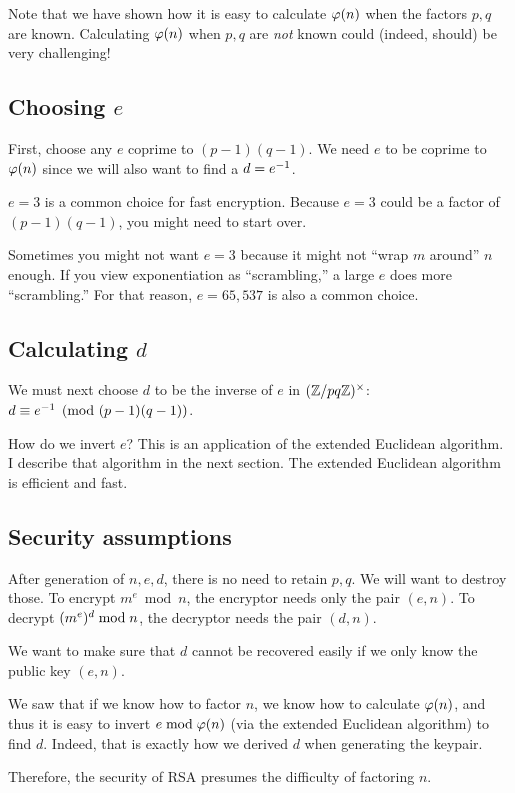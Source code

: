 \begin{remark}
  Note that we have shown how it is easy to calculate $\varphi\mathopen{}\left( {n} \right)\mathclose{}$ when
  the factors $p, q$ are known. Calculating $\varphi\mathopen{}\left( {n} \right)\mathclose{}$ when $p, q$ are
  \emph{not} known could (indeed, should) be very challenging!
\end{remark}

\subsection{Choosing $e$}

First, choose any $e$ coprime to $(p - 1) (q - 1)$. We need $e$ to be
coprime to $\varphi\mathopen{}\left( {n} \right)\mathclose{}$ since we will also want to find a $d = {e}^{-1}$.

$e = 3$ is a common choice for fast encryption. Because $e = 3$ could be
a factor of $(p - 1)(q - 1)$, you might need to start over.

Sometimes you might not want $e = 3$ because it might not ``wrap $m$
around'' $n$ enough. If you view exponentiation as ``scrambling,'' a
large $e$ does more ``scrambling.'' For that reason, $e = 65,537$ is
also a common choice.

\subsection{Calculating $d$}

We must next choose $d$ to be the inverse of $e$ in $\mathopen{}\left( {\mathbb{Z} / pq\mathbb{Z}} \right)\mathclose{}^\times$: $d
\equiv {e}^{-1} \pmod{(p - 1) (q - 1)}$.

How do we invert $e$? This is an application of the extended Euclidean
algorithm. I describe that algorithm in the next section. The extended
Euclidean algorithm is efficient and fast.

\subsection{Security assumptions}

\begin{remark}
  After generation of $n, e, d$, there is no need to retain $p, q$. We
  will want to destroy those. To encrypt $m^e \bmod n$, the encryptor
  needs only the pair $(e, n)$. To decrypt $\mathopen{}\left( {m^e} \right)\mathclose{}^d \bmod n$, the
  decryptor needs the pair $(d, n)$.
\end{remark}

\begin{remark}
  We want to make sure that $d$ cannot be recovered easily if we only
  know the public key $(e, n)$.

  We saw that if we know how to factor $n$, we know how to calculate
  $\varphi\mathopen{}\left( {n} \right)\mathclose{}$, and thus it is easy to invert $e \bmod \varphi\mathopen{}\left( {n} \right)\mathclose{}$ (via
  the extended Euclidean algorithm) to find $d$. Indeed, that is exactly
  how we derived $d$ when generating the keypair.

  Therefore, the security of RSA presumes the difficulty of factoring
  $n$.
\end{remark}

